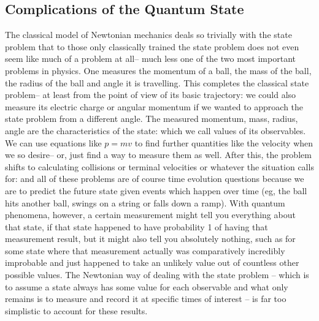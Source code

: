 \subsection{Complications of the Quantum State} 
The classical model of Newtonian mechanics deals so trivially with the state problem that to those only classically trained the state problem does not even seem like much of a problem at all-- much less one of the two most important problems in physics. One measures the momentum of a ball, the mass of the ball, the radius of the ball and angle it is travelling. This completes the classical state problem-- at least from the point of view of its basic trajectory: we could also measure its electric charge or angular momentum if we wanted to approach the state problem from a different angle. The measured momentum, mass, radius, angle are the characteristics of the state: which we call values of its observables. We can use equations like $p=mv$ to find further quantities like the velocity when we so desire-- or, just find a way to measure them as well. After this, the problem shifts to calculating collisions or terminal velocities or whatever the situation calls for: and all of these problems are of course time evolution questions because we are to predict the future state given events which happen over time (eg, the ball hits another ball, swings on a string or falls down a ramp). With quantum phenomena, however, a certain measurement might tell you everything about that state, if that state happened to have probability 1 of having that measurement result, but it might also tell you absolutely nothing, such as for some state where that measurement actually was comparatively incredibly improbable and just happened to take an unlikely value out of countless other possible values. The Newtonian way of dealing with the state problem -- which is to assume a state always has some value for each observable and what only remains is to measure and record it at specific times of interest -- is far too simplistic to account for these results.
\\\\
